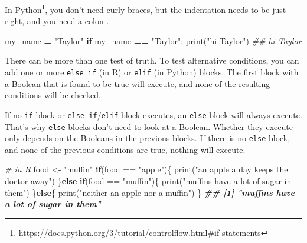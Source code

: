 \documentclass[
  12pt,
  krantz2]{krantz}
\makeatletter
\newenvironment{Shaded}{\begin{snugshade}}{\end{snugshade}}
\newcommand{\BuiltInTok}[1]{#1}
\newcommand{\CommentTok}[1]{\textcolor[rgb]{0.37,0.37,0.37}{\textit{#1}}}
\newcommand{\ControlFlowTok}[1]{\textcolor[rgb]{0.27,0.27,0.27}{\textbf{#1}}}
\newcommand{\DocumentationTok}[1]{\textcolor[rgb]{0.37,0.37,0.37}{\textbf{\textit{#1}}}}
\newcommand{\FunctionTok}[1]{\textcolor[rgb]{0,0,0}{#1}}
\newcommand{\NormalTok}[1]{#1}
\newcommand{\OperatorTok}[1]{\textcolor[rgb]{0.43,0.43,0.43}{\textbf{#1}}}
\newcommand{\OtherTok}[1]{\textcolor[rgb]{0.37,0.37,0.37}{#1}}
\newcommand{\SpecialCharTok}[1]{\textcolor[rgb]{0,0,0}{#1}}
\newcommand{\StringTok}[1]{\textcolor[rgb]{0.5,0.5,0.5}{#1}}
\renewcommand{\href}[2]{#2\footnote{\url{#1}}}
\newenvironment{kframe}{%
\medskip{}
\setlength{\fboxsep}{.8em}
 \def\at@end@of@kframe{}%
 \ifinner\ifhmode%
  \def\at@end@of@kframe{\end{minipage}}%
  \begin{minipage}{\columnwidth}%
 \fi\fi%
 \def\FrameCommand##1{\hskip\@totalleftmargin \hskip-\fboxsep
 \colorbox{shadecolor}{##1}\hskip-\fboxsep
     \hskip-\linewidth \hskip-\@totalleftmargin \hskip\columnwidth}%
 \MakeFramed {\advance\hsize-\width
   \@totalleftmargin\z@ \linewidth\hsize
   \@setminipage}}%
 {\par\unskip\endMakeFramed%
 \at@end@of@kframe}
\renewenvironment{Shaded}{\begin{kframe}}{\end{kframe}}
\makeatother
\begin{document}
\href{https://docs.python.org/3/tutorial/controlflow.html\#if-statements}{In Python}, you don't need curly braces, but the indentation needs to be just right, and you need a colon \citep{Lutz13}.

\begin{Shaded}
\begin{Highlighting}[]
\NormalTok{my\_name }\OperatorTok{=} \StringTok{"Taylor"}
\ControlFlowTok{if}\NormalTok{ my\_name }\OperatorTok{==} \StringTok{"Taylor"}\NormalTok{:}
    \BuiltInTok{print}\NormalTok{(}\StringTok{"hi Taylor"}\NormalTok{)}
\CommentTok{\#\# hi Taylor}
\end{Highlighting}
\end{Shaded}

There can be more than one test of truth. To test alternative conditions, you can add one or more \texttt{else\ if} (in R) or \texttt{elif} (in Python) blocks. The first block with a Boolean that is found to be true will execute, and none of the resulting conditions will be checked.

If no \texttt{if} block or \texttt{else\ if}/\texttt{elif} block executes, an \texttt{else} block will always execute. That's why \texttt{else} blocks don't need to look at a Boolean. Whether they execute only depends on the Booleans in the previous blocks. If there is no \texttt{else} block, and none of the previous conditions are true, nothing will execute.

\begin{Shaded}
\begin{Highlighting}[]
\CommentTok{\# in R}
\NormalTok{food }\OtherTok{\textless{}{-}} \StringTok{"muffin"}
\ControlFlowTok{if}\NormalTok{(food }\SpecialCharTok{==} \StringTok{"apple"}\NormalTok{)\{}
    \FunctionTok{print}\NormalTok{(}\StringTok{"an apple a day keeps the doctor away"}\NormalTok{)}
\NormalTok{\}}\ControlFlowTok{else} \ControlFlowTok{if}\NormalTok{(food }\SpecialCharTok{==} \StringTok{"muffin"}\NormalTok{)\{}
  \FunctionTok{print}\NormalTok{(}\StringTok{"muffins have a lot of sugar in them"}\NormalTok{)}
\NormalTok{\}}\ControlFlowTok{else}\NormalTok{\{}
  \FunctionTok{print}\NormalTok{(}\StringTok{"neither an apple nor a muffin"}\NormalTok{)}
\NormalTok{\}}
\DocumentationTok{\#\# [1] "muffins have a lot of sugar in them"}
\end{Highlighting}
\end{Shaded}
\end{document}

